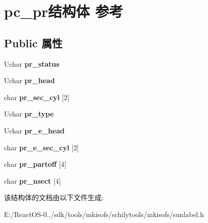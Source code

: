 \hypertarget{structpc__pr}{}\section{pc\+\_\+pr结构体 参考}
\label{structpc__pr}
\subsection*{Public 属性}
\begin{DoxyCompactItemize}
\item 
\mbox{\label{structpc__pr_a93dda0d6602e6228c62a84bcb7034471}} 
Uchar {\bfseries pr\+\_\+status}
\item 
\mbox{\label{structpc__pr_afb2c0728c49086c2d48c52ca51d4695a}} 
Uchar {\bfseries pr\+\_\+head}
\item 
\mbox{\label{structpc__pr_ab255c15ce5a2dc586fdc636ff8ef513f}} 
char {\bfseries pr\+\_\+sec\+\_\+cyl} \mbox{[}2\mbox{]}
\item 
\mbox{\label{structpc__pr_a85a27b4eb3216153411f4c29e642f96c}} 
Uchar {\bfseries pr\+\_\+type}
\item 
\mbox{\label{structpc__pr_a3ccbce7391d83d056f3f353a60f4df54}} 
Uchar {\bfseries pr\+\_\+e\+\_\+head}
\item 
\mbox{\label{structpc__pr_af8dc2e543f82b49311eb7bb0de764a45}} 
char {\bfseries pr\+\_\+e\+\_\+sec\+\_\+cyl} \mbox{[}2\mbox{]}
\item 
\mbox{\label{structpc__pr_a1614a61165ee1365c677d0cf6a7c15c4}} 
char {\bfseries pr\+\_\+partoff} \mbox{[}4\mbox{]}
\item 
\mbox{\label{structpc__pr_a10af302dd422e2d3cb7c4640983827aa}} 
char {\bfseries pr\+\_\+nsect} \mbox{[}4\mbox{]}
\end{DoxyCompactItemize}


该结构体的文档由以下文件生成\+:\begin{DoxyCompactItemize}
\item 
E\+:/\+React\+O\+S-\/0../sdk/tools/mkisofs/schilytools/mkisofs/sunlabel.\+h\end{DoxyCompactItemize}
